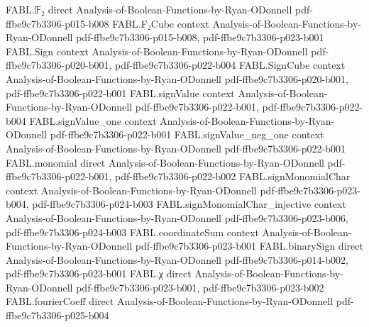 \begin{theorem}
\label{FABL.majorityThreeTree01_uniform_averageCost}
\leanok
{}
\proofstep
  {FABL.𝔽₂}
  {direct}
  {Analysis-of-Boolean-Functions-by-Ryan-ODonnell}
  {pdf-ffbe9c7b3306-p015-b008}
\proofstep
  {FABL.F₂Cube}
  {context}
  {Analysis-of-Boolean-Functions-by-Ryan-ODonnell}
  {pdf-ffbe9c7b3306-p015-b008,
    pdf-ffbe9c7b3306-p023-b001}
\proofstep
  {FABL.Sign}
  {context}
  {Analysis-of-Boolean-Functions-by-Ryan-ODonnell}
  {pdf-ffbe9c7b3306-p020-b001,
    pdf-ffbe9c7b3306-p022-b004}
\proofstep
  {FABL.SignCube}
  {context}
  {Analysis-of-Boolean-Functions-by-Ryan-ODonnell}
  {pdf-ffbe9c7b3306-p020-b001,
    pdf-ffbe9c7b3306-p022-b001}
\proofstep
  {FABL.signValue}
  {context}
  {Analysis-of-Boolean-Functions-by-Ryan-ODonnell}
  {pdf-ffbe9c7b3306-p022-b001,
    pdf-ffbe9c7b3306-p022-b004}
\proofstep
  {FABL.signValue_one}
  {context}
  {Analysis-of-Boolean-Functions-by-Ryan-ODonnell}
  {pdf-ffbe9c7b3306-p022-b001}
\proofstep
  {FABL.signValue_neg_one}
  {context}
  {Analysis-of-Boolean-Functions-by-Ryan-ODonnell}
  {pdf-ffbe9c7b3306-p022-b001}
\proofstep
  {FABL.monomial}
  {direct}
  {Analysis-of-Boolean-Functions-by-Ryan-ODonnell}
  {pdf-ffbe9c7b3306-p022-b001,
    pdf-ffbe9c7b3306-p022-b002}
\proofstep
  {FABL.signMonomialChar}
  {context}
  {Analysis-of-Boolean-Functions-by-Ryan-ODonnell}
  {pdf-ffbe9c7b3306-p023-b004,
    pdf-ffbe9c7b3306-p024-b003}
\proofstep
  {FABL.signMonomialChar_injective}
  {context}
  {Analysis-of-Boolean-Functions-by-Ryan-ODonnell}
  {pdf-ffbe9c7b3306-p023-b006,
    pdf-ffbe9c7b3306-p024-b003}
\proofstep
  {FABL.coordinateSum}
  {context}
  {Analysis-of-Boolean-Functions-by-Ryan-ODonnell}
  {pdf-ffbe9c7b3306-p023-b001}
\proofstep
  {FABL.binarySign}
  {direct}
  {Analysis-of-Boolean-Functions-by-Ryan-ODonnell}
  {pdf-ffbe9c7b3306-p014-b002,
    pdf-ffbe9c7b3306-p023-b001}
\proofstep
  {FABL.χ}
  {direct}
  {Analysis-of-Boolean-Functions-by-Ryan-ODonnell}
  {pdf-ffbe9c7b3306-p023-b001,
    pdf-ffbe9c7b3306-p023-b002}
\proofstep
  {FABL.fourierCoeff}
  {direct}
  {Analysis-of-Boolean-Functions-by-Ryan-ODonnell}
  {pdf-ffbe9c7b3306-p025-b004}

\end{theorem}
